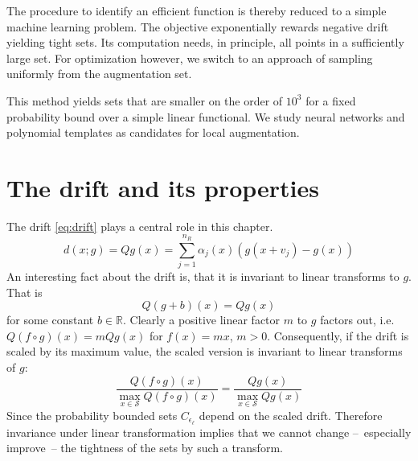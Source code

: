 The procedure to identify an efficient function is thereby reduced to a simple machine learning problem.
The objective exponentially rewards negative drift yielding tight sets.
Its computation needs, in principle, all points in a sufficiently large set.
For optimization however, we switch to an approach of sampling uniformly from the augmentation set.

This method yields sets that are smaller on the order of $10^3$ for a fixed probability bound over a simple linear functional.
We study neural networks and polynomial templates as candidates for local augmentation.

\section{The drift and its properties}
The drift \eqref{eq:drift} plays a central role in this chapter.
\begin{equation}
	d(x; g) = Qg(x) = \sum_{j=1}^{n_R} \alpha_j(x) (g(x+v_j) -  g(x))
\end{equation}
An interesting fact about the drift is, that it is invariant to linear transforms to $g$.
That is
\begin{equation}
	Q(g + b)(x)
	=Qg(x)
\end{equation}
for some constant $b\in\mathbb{R}$.
Clearly a positive linear factor $m$ to $g$ factors out, i.e.\ $Q(f\circ g)(x)=mQg(x)$ for $f(x) = mx$, $m>0$.
Consequently, if the drift is scaled by its maximum value, the scaled version is invariant to linear
transforms of $g$:
\begin{equation}
	\frac{Q(f\circ g)(x)}{\max_{x\in\mathcal{S}}Q(f \circ g)(x)}
	=
	\frac{Qg(x)}{\max_{x\in\mathcal{S}}Qg(x)}
\end{equation}
Since the probability bounded sets $C_{\epsilon_{\ell}}$ depend on the scaled drift.
Therefore invariance under linear transformation implies that we cannot change --~especially improve~-- the tightness of the sets by such a transform.

